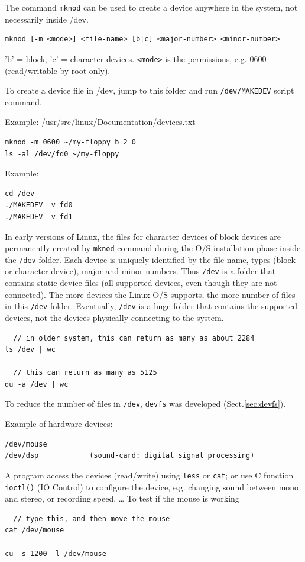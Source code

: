 \begin{mdframed}
The command \verb!mknod! can be used to create a device anywhere in the system,
not necessarily inside /dev.

\begin{verbatim}
mknod [-m <mode>] <file-name> [b|c] <major-number> <minor-number>
\end{verbatim}
'b' = block, 'c' = character devices. \verb!<mode>! is the permissions, e.g.
0600 (read/writable by root only).

To create a device file in /dev, jump to this folder and run \verb!/dev/MAKEDEV!
script command.

Example: \url{ /usr/src/linux/Documentation/devices.txt}
\begin{verbatim}
mknod -m 0600 ~/my-floppy b 2 0
ls -al /dev/fd0 ~/my-floppy
\end{verbatim}

Example:
\begin{verbatim}
cd /dev
./MAKEDEV -v fd0
./MAKEDEV -v fd1
\end{verbatim}

\end{mdframed}


In early versions of Linux, the files for character devices of block devices are
permanently created by \verb!mknod! command during the O/S installation phase
inside the \verb!/dev! folder. Each device is uniquely identified by the file
name, types (block or character device), major and minor numbers.
Thus \verb!/dev! is a folder that contains static device files (all supported
devices, even though they are not connected). The more devices the Linux O/S
supports, the more number of files in this \verb!/dev! folder. Eventually,
\verb!/dev! is a huge folder that contains the supported devices, not the
devices physically connecting to the system.
\begin{verbatim}
  // in older system, this can return as many as about 2284
ls /dev | wc 

  // this can return as many as 5125  
du -a /dev | wc  
\end{verbatim}

To reduce the number of files in \verb!/dev!, \verb!devfs! was developed
(Sect.\ref{sec:devfs}).

Example of hardware devices:
\begin{verbatim}
/dev/mouse 
/dev/dsp 			(sound-card: digital signal processing)
\end{verbatim}
A program access the devices (read/write) using \verb!less! or \verb!cat!; or
use C function \verb!ioctl()! (IO Control) to configure the device, e.g.
changing sound between mono and stereo, or recording speed, \ldots
To test if the mouse is working
\begin{verbatim}
  // type this, and then move the mouse
cat /dev/mouse	 

cu -s 1200 -l /dev/mouse
\end{verbatim}


